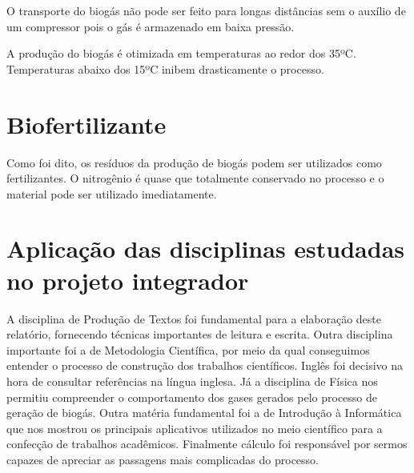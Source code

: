 O transporte do biogás não pode ser feito para longas distâncias sem o auxílio de um compressor pois o gás é armazenado em baixa pressão.

A produção do biogás é otimizada em temperaturas ao redor dos 35ºC. Temperaturas abaixo dos 15ºC inibem drasticamente o processo.

\section{Biofertilizante}

Como foi dito, os resíduos da produção de biogás podem ser utilizados como fertilizantes. O nitrogênio é quase que totalmente conservado no processo e o material pode ser utilizado imediatamente.

\section{Aplicação das disciplinas estudadas no projeto integrador}

A disciplina de Produção de Textos foi fundamental para a elaboração deste relatório, fornecendo técnicas importantes de leitura e escrita. Outra disciplina importante foi a de Metodologia Científica, por meio da qual conseguimos entender o processo de construção dos trabalhos científicos. Inglês foi decisivo na hora de consultar referências na língua inglesa. Já a disciplina de Física nos permitiu compreender o comportamento dos gases gerados pelo processo de geração de biogás. Outra matéria fundamental foi a de Introdução à Informática que nos mostrou os principais aplicativos utilizados no meio científico para a confecção de trabalhos acadêmicos. Finalmente cálculo foi responsável por sermos capazes de apreciar as passagens mais complicadas do processo.